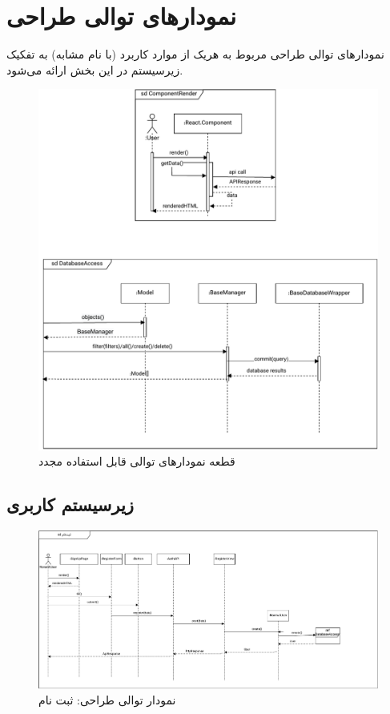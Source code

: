 \chapter{نمودارهای توالی طراحی}


نمودارهای توالی طراحی مربوط به هریک از موارد کاربرد (با نام مشابه) به تفکیک زیرسیستم در این بخش ارائه می‌شود.



\begin{figure}[ht!]
	\centering
	\includegraphics[scale=0.8]{figs/design-sequence/reusable.pdf}
	\caption{قطعه نمودارهای توالی قابل استفاده مجدد}
\end{figure}
\FloatBarrier
\newpage


\section{زیرسیستم کاربری}

\eject \pdfpagewidth=12in \pdfpageheight=7in
\begin{figure}[ht!]
	\centering
	\includegraphics[scale=0.8]{figs/design-sequence/3-1.pdf}
	\caption{نمودار توالی طراحی: ثبت نام}
\end{figure}
\FloatBarrier
\newpage

